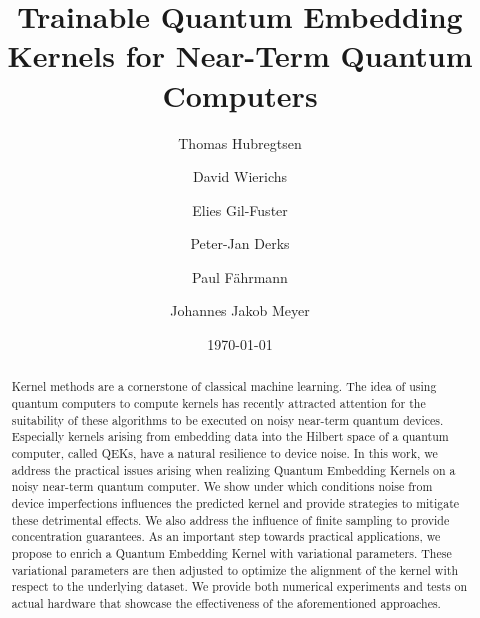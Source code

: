 \documentclass[twocolumn,superscriptaddress,nofootinbib]{revtex4-2}
\begin{document}
\title{Trainable Quantum Embedding Kernels for Near-Term Quantum Computers}
\author{Thomas Hubregtsen}

\author{David Wierichs}

\author{Elies Gil-Fuster}

\author{Peter-Jan Derks}

\author{Paul Fährmann}

\author{Johannes Jakob Meyer}

\date{\today}

\begin{abstract}
Kernel methods are a cornerstone of classical machine learning. The idea of using quantum computers to compute kernels has recently attracted attention for the suitability of these algorithms to be executed on noisy near-term quantum devices. 
Especially kernels arising from embedding data into the Hilbert space of a quantum computer, called \acp{QEK}, have a natural resilience to device noise.
In this work, we address the practical issues arising when realizing Quantum Embedding Kernels on a noisy near-term quantum computer. 
We show under which conditions noise from device imperfections influences the predicted kernel and provide strategies to mitigate these detrimental effects. We also address the influence of finite sampling to provide concentration guarantees.
As an important step towards practical applications, we propose to enrich a Quantum Embedding Kernel with variational parameters. These variational parameters are then adjusted to optimize the alignment of the kernel with respect to the underlying dataset. 
We provide both numerical experiments and tests on actual hardware that showcase the effectiveness of the aforementioned approaches. 
\end{abstract}
\end{document}
